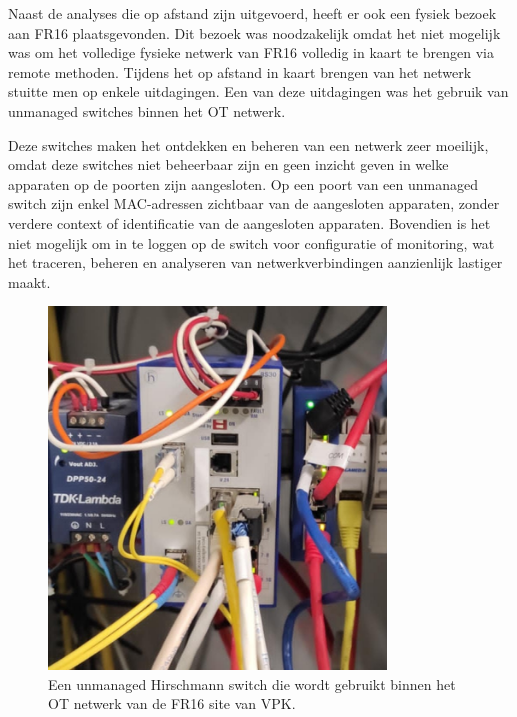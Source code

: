 Naast de analyses die op afstand zijn uitgevoerd, heeft er ook een fysiek bezoek aan FR16 plaatsgevonden. Dit bezoek was noodzakelijk omdat het niet mogelijk was om het volledige fysieke netwerk van FR16 volledig in kaart te brengen via remote methoden. Tijdens het op afstand in kaart brengen van het netwerk stuitte men op enkele uitdagingen. Een van deze uitdagingen was het gebruik van unmanaged switches binnen het OT netwerk. 

\vspace{5mm}
Deze switches maken het ontdekken en beheren van een netwerk zeer moeilijk, omdat deze switches niet beheerbaar zijn en geen inzicht geven in welke apparaten op de poorten zijn aangesloten. Op een poort van een unmanaged switch zijn enkel MAC-adressen zichtbaar van de aangesloten apparaten, zonder verdere context of identificatie van de aangesloten apparaten. Bovendien is het niet mogelijk om in te loggen op de switch voor configuratie of monitoring, wat het traceren, beheren en analyseren van netwerkverbindingen aanzienlijk lastiger maakt.

\vspace{5mm}
\begin{figure}[H]
    \centering
    \includegraphics[width=0.8\textwidth]{fotos/hirschmannSwitch.jpg}
    \caption[Hirschmann switch]{\label{fig:hirschmannSwitch} Een unmanaged Hirschmann switch die wordt gebruikt binnen het OT netwerk van de FR16 site van VPK.}
\end{figure}
\vspace{5mm}

